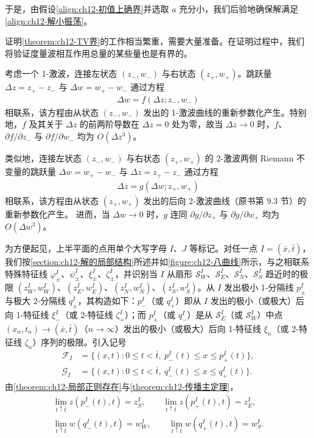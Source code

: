 \documentclass[../../main.tex]{subfiles}
\begin{document}
于是，由假设\eqref{align:ch12-初值上确界}并选取 $a$ 充分小，我们后验地确保解满足\eqref{align:ch12-解小振荡}。

证明\cref{theorem:ch12-TV界}的工作相当繁重，需要大量准备。在证明过程中，我们将验证度量波相互作用总量的某些量也是有界的。

考虑一个 1-激波，连接左状态 $(z_-,w_-)$ 与右状态 $(z_+,w_+)$。跳跃量 $\Delta z=z_+-z_-$ 与 $\Delta w=w_+-w_-$ 通过方程
\begin{align}
\Delta w=f(\Delta z;z_-,w_-)
\label{align:ch12-1激波参数}
\end{align}
相联系，该方程由从状态 $(z_-,w_-)$ 发出的 1-激波曲线的重新参数化产生。特别地，$f$ 及其关于 $\Delta z$ 的前两阶导数在 $\Delta z=0$ 处为零，故当 $\Delta z\to0$ 时，$f$、$\partial f/\partial z_-$ 与 $\partial f/\partial w_-$ 均为 $O(\Delta z^3)$。

类似地，连接左状态 $(z_-,w_-)$ 与右状态 $(z_+,w_+)$ 的 2-激波两侧 Riemann 不变量的跳跃量 $\Delta w=w_+-w_-$ 与 $\Delta z=z_+-z_-$ 通过方程
\begin{align}
\Delta z=g(\Delta w;z_+,w_+)
\label{align:ch12-2激波参数}
\end{align}
相联系，该方程由从状态 $(z_+,w_+)$ 发出的后向 2-激波曲线（原书第 9.3 节）的重新参数化产生。
进而，当 $\Delta w\to0$ 时，$g$ 连同 $\partial g/\partial z_+$ 与 $\partial g/\partial w_+$ 均为 $O(\Delta w^3)$。

为方便起见，上半平面的点用单个大写字母 $I$、$J$ 等标记。对任一点 $I=(\bar x,\bar t)$，我们按\cref{section:ch12-解的局部结构}所述并如\cref{figure:ch12-八曲线}所示，与之相联系特殊特征线 $\varphi_\pm^I$、$\psi_\pm^I$、$\xi_\pm^I$、$\zeta_\pm^I$，并识别当 $I$ 从扇形 $\mathscr{S}_W^I$、$\mathscr{S}_E^I$、$\mathscr{S}_N^I$、$\mathscr{S}_S^I$ 趋近时的极限 $(z_W^I,w_W^I)$、$(z_E^I,w_E^I)$、$(z_N^I,w_N^I)$、$(z_S^I,w_S^I)$。从 $I$ 发出极小 1-分隔线 $p_\pm^I$ 与极大 2-分隔线 $q_\pm^I$，其构造如下：$p_-^I$（或 $q_+^I$）即从 $I$ 发出的极小（或极大）后向 1-特征线 $\xi_-^I$（或 2-特征线 $\zeta_+^I$）；而 $p_+^I$（或 $q_-^I$）是从 $\mathscr{S}_E^I$（或 $\mathscr{S}_W^I$）中点 $(x_n,t_n)\to(\bar x,\bar t)$（$n\to\infty$）发出的极小（或极大）后向 1-特征线 $\xi_n$（或 2-特征线 $\zeta_n$）序列的极限。引入记号
\begin{align}
\mathscr{F}_I&=\{(x,t):0\leqslant t<\bar t,\ p_-^I(t)\leqslant x\leqslant p_+^I(t)\},
\label{align:ch12-FI}\\
\mathscr{G}_I&=\{(x,t):0\leqslant t<\bar t,\ q_-^I(t)\leqslant x\leqslant q_+^I(t)\}.
\label{align:ch12-GI}
\end{align}
由\cref{theorem:ch12-局部正则存在}与\cref{theorem:ch12-传播主定理}，
\begin{align}
\lim_{t\uparrow\bar t}z(p_-^I(t),t)=z_S^I,\qquad \lim_{t\uparrow\bar t}z(p_+^I(t),t)=z_E^I,
\label{align:ch12-p极限z}\\
\lim_{t\uparrow\bar t}w(q_-^I(t),t)=w_W^I,\qquad \lim_{t\uparrow\bar t}w(q_+^I(t),t)=w_S^I.
\label{align:ch12-q极限w}
\end{align}
\end{document}
